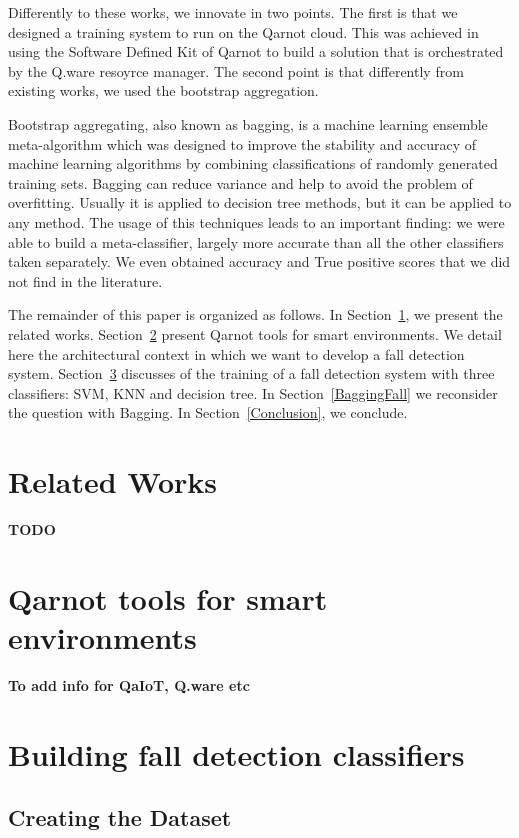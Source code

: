 \documentclass[10pt, conference, compsocconf]{IEEEtran}
\begin{document}
Differently to these works, we innovate in two points. The first is that we designed a training system to run on 
the Qarnot cloud. This was achieved in using the Software Defined Kit of Qarnot to build a solution that is orchestrated by 
the Q.ware resoyrce manager. The second point is that differently from existing works, we used the  bootstrap aggregation. 

Bootstrap aggregating, also known as bagging, is a machine learning ensemble meta-algorithm which was designed to improve the stability and accuracy of machine learning algorithms by combining classifications of randomly generated training sets. Bagging can reduce variance and help to avoid the problem of overfitting. Usually it is applied to decision tree methods, but it can be applied to any method. The usage of this techniques leads to an important finding: we were able to build a meta-classifier, 
largely more accurate than all the other classifiers taken separately. We even obtained accuracy and True positive scores that 
we did not find in the literature. 

The remainder of this paper is organized as follows. In Section~\ref{Related}, we present the related works. Section~\ref{Smart} 
present Qarnot tools for smart environments. We detail here the architectural context in which we want to develop a fall 
detection system. Section~\ref{Fall} discusses of the training of a fall detection system with three classifiers: SVM, KNN and decision tree. 
In Section~\ref{BaggingFall} we reconsider the question with Bagging. In Section~\ref{Conclusion}, we conclude.

\section{Related Works} \label{Related}

{\bf TODO}

\section{Qarnot tools for smart environments} \label{Smart}

{\bf To add info for QaIoT, Q.ware etc}


\section{Building fall detection classifiers} \label{Fall}

\subsection{Creating the Dataset} 
 
\end{document}
